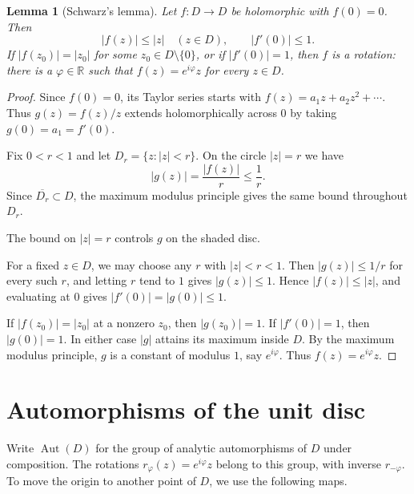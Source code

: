 \documentclass[11pt]{article}
\theoremstyle{plain}
\newtheorem{lemma}[theorem]{Lemma}
\theoremstyle{definition}
\theoremstyle{boldremark}
\theoremstyle{remark}
\numberwithin{equation}{section}
\newcommand{\R}{\mathbb{R}}
\newenvironment{lecturefigure}
 {\par\addvspace{0.25em}\begingroup\setlength{\parskip}{0pt}\centering}
 {\par\endgroup\addvspace{0.25em}}
\begin{document}
\begin{lemma}[Schwarz's lemma]\label{lem:schwarz}
Let $f:D\to D$ be holomorphic with $f(0)=0$. Then
\begin{equation}
 |f(z)|\leq |z|\quad(z\in D),\qquad |f'(0)|\leq 1.
\end{equation}
If $|f(z_0)|=|z_0|$ for some $z_0\in D\setminus\{0\}$, or if
$|f'(0)|=1$, then $f$ is a rotation: there is a $\varphi\in\R$ such
that $f(z)=e^{i\varphi}z$ for every $z\in D$.
\end{lemma}
\begin{proof}
Since $f(0)=0$, its Taylor series starts with
$f(z)=a_1z+a_2z^2+\cdots$. Thus $g(z)=f(z)/z$ extends holomorphically
across $0$ by taking $g(0)=a_1=f'(0)$.

Fix $0<r<1$ and let $D_r=\{z:|z|<r\}$. On the circle $|z|=r$ we have
\begin{equation}\label{g:bd}
 |g(z)|=\frac{|f(z)|}{r}\leq\frac{1}{r}.
\end{equation}
Since $\overline{D_r}\subset D$, the maximum modulus principle gives
the same bound throughout $D_r$.
\begin{lecturefigure}

{\small The bound on $|z|=r$ controls $g$ on the shaded disc.}
\end{lecturefigure}
For a fixed $z\in D$, we may choose any $r$ with $|z|<r<1$.
Then $|g(z)|\leq 1/r$ for every such $r$, and letting $r$ tend to $1$ gives $|g(z)|\leq1$.
Hence $|f(z)|\leq|z|$, and evaluating at $0$ gives $|f'(0)|=|g(0)|\leq1$.

If $|f(z_0)|=|z_0|$ at a nonzero $z_0$, then $|g(z_0)|=1$.
If $|f'(0)|=1$, then $|g(0)|=1$. In either case $|g|$ attains its
maximum inside $D$. By the maximum modulus principle, $g$ is a
constant of modulus $1$, say $e^{i\varphi}$. Thus $f(z)=e^{i\varphi}z$.
\end{proof}

\section{Automorphisms of the unit disc}
Write $\operatorname{Aut}(D)$ for the group of analytic automorphisms
of $D$ under composition. The rotations $r_\varphi(z)=e^{i\varphi}z$
belong to this group, with inverse $r_{-\varphi}$. To move the origin
to another point of $D$, we use the following maps.
\end{document}
